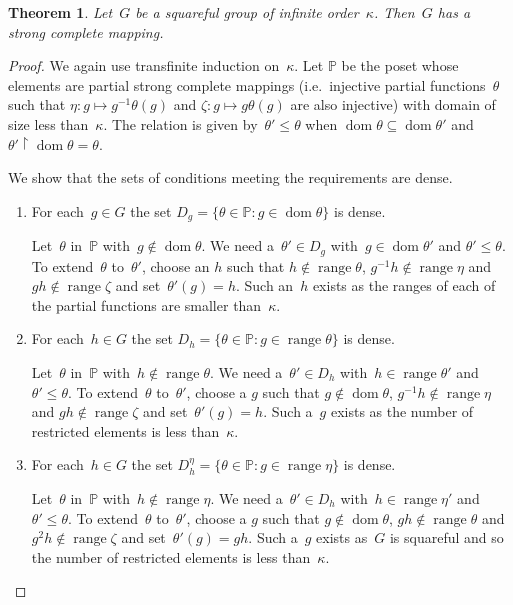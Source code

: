 \documentclass[12pt,a4paper]{article}
\newtheorem{thm}{Theorem}[section]
\DeclareMathOperator{\dom}{dom}
\DeclareMathOperator{\ran}{range}
\newcommand{\rest}{\mathbin{\upharpoonright}}
\renewcommand{\P}{\mathbb{P}}
\begin{document}
\begin{thm}\label{thm:squarefulSCM}
Let~$G$ be a squareful group of infinite order~$\kappa$.  Then~$G$ has a strong complete mapping.
\end{thm}

\begin{proof}
We again use transfinite induction on~$\kappa$.   Let $\P$ be the poset whose elements are partial strong complete mappings (i.e.~injective partial functions~$\theta$ such that $\eta: g \mapsto g^{-1}\theta(g)$ and $\zeta: g \mapsto g\theta(g)$ are also injective) with domain of size less than~$\kappa$.  The relation is given by~$\theta' \leq \theta$ when $\dom \theta \subseteq \dom \theta'$ and $\theta' \rest \dom \theta = \theta$.

We show that the sets of conditions meeting the requirements are dense.

\begin{enumerate}

\item For each~$g \in G$ the set  $D_g = \{ \theta \in \P : g \in \dom \theta \}$ is dense.

Let~$\theta$ in~$\P$ with~$g \not\in \dom \theta$.  We need a~$\theta' \in D_g$ with~$g \in \dom \theta'$ and $\theta' \leq \theta$.  To extend~$\theta$ to~$\theta'$, choose an $h$ such that $h \not\in \ran \theta$, $g^{-1}h \not\in \ran \eta$ and $gh \not\in \ran \zeta$ and set~$\theta'(g) = h$.  Such an~$h$ exists as the ranges of each of the partial functions are smaller than~$\kappa$.


\item For each~$h \in G$ the set  $D_h = \{ \theta \in \P : g \in \ran \theta \}$ is dense.

Let~$\theta$ in~$\P$ with~$h \not\in \ran \theta$.  We need a~$\theta' \in D_h$ with~$h \in \ran \theta'$ and $\theta' \leq \theta$.
To extend~$\theta$ to~$\theta'$,  choose a $g$ such that $g \not\in \dom \theta$, $g^{-1}h \not\in \ran \eta$ and $gh \not\in \ran \zeta$ and set~$\theta'(g) = h$.  Such a~$g$ exists as the number of restricted elements is less than~$\kappa$.


\item For each~$h \in G$ the set  $D_h^{\eta} = \{ \theta \in \P : g \in \ran \eta \}$ is dense.

Let~$\theta$ in~$\P$ with~$h \not\in \ran \eta$.  We need a~$\theta' \in D_h$ with~$h \in \ran \eta'$ and $\theta' \leq \theta$.
To extend~$\theta$ to~$\theta'$,  choose a $g$ such that $g \not\in \dom \theta$, $gh \not\in \ran \theta$ and $g^2h \not\in \ran \zeta$ and set~$\theta'(g) = gh$.  Such a~$g$ exists as~$G$ is squareful and so the number of restricted elements is less than~$\kappa$.



\end{enumerate}
\end{proof}
\end{document}

